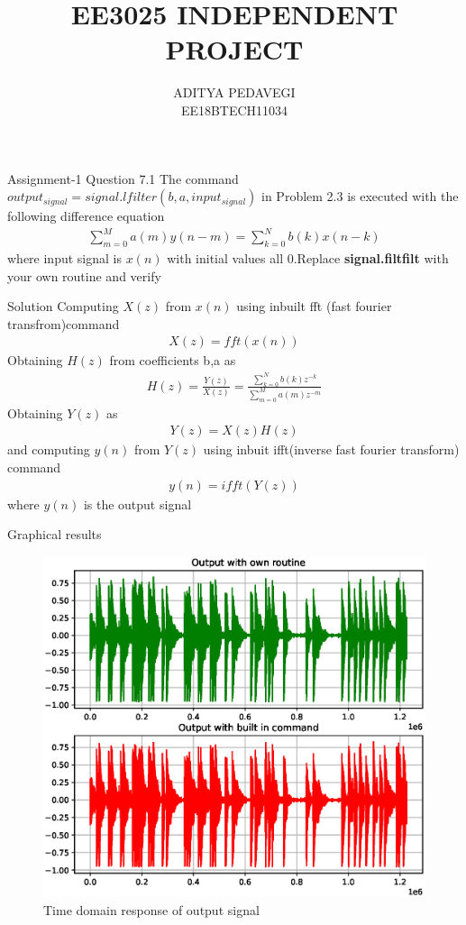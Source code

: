 \documentclass{beamer}
\title{EE3025 INDEPENDENT PROJECT}
\author{ADITYA PEDAVEGI\\EE18BTECH11034}
\begin{document}
\maketitle
\begin{frame}{Assignment-1 Question 7.1}
The command $output_{signal} = signal.lfilter(b,a,input_{signal})$ in Problem 2.3 is executed with the following difference equation 
\begin{align}
 \sum _{m=0}^{M} a(m)y(n-m) = \sum_{k=0}^{N} b(k)x(n-k)
\end{align}
where input signal is $x(n)$ with initial values all 0.Replace \textbf{signal.filtfilt} with your own routine and verify
\end{frame}

\begin{frame}{Solution}
Computing $X(z)$ from $x(n)$ using inbuilt fft (fast fourier transfrom)command
\begin{align}
X(z) = fft(x(n))
\end{align}
Obtaining $H(z)$ from coefficients b,a as 
\begin{align}
H(z)= \frac{Y(z)}{X(z)} = \frac{\sum _{k=0}^{N}b(k)z^{-k}}{\sum _{m=0}^{M}a(m)z^{-m}}
\end{align}
Obtaining $Y(z)$ as 
\begin{align}
Y(z) = X(z)H(z)
\end{align}
and computing $y(n)$ from $Y(z)$ using inbuit ifft(inverse fast fourier transform) command
\begin{align}
y(n) = ifft(Y(z))
\end{align}
where $y(n)$ is the output signal
\end{frame}
\begin{frame}{Graphical results}
\begin{figure}[!h]
\includegraphics[width=0.75\columnwidth]{./figs/ee18btech11034_1.eps}
\caption{Time domain response of output signal}
\label{fig:Figure1}
\end{figure}
\end{frame}
\end{document}
